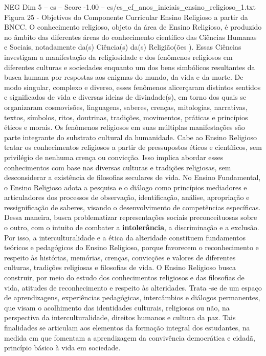 \begin{textsample}{NEG Dim 5 – es – Score -1.00 – es/es\_ef\_anos\_iniciais\_ensino\_religioso\_1.txt}
Figura 25 - Objetivos do Componente Curricular Ensino Religioso a partir da BNCC.
O conhecimento religioso, objeto da área de Ensino Religioso, é produzido no âmbito das diferentes áreas do conhecimento científico das Ciências Humanas e Sociais, notadamente da(s) Ciência(s) da(s) Religião(ões ).
Essas Ciências investigam a manifestação da religiosidade e dos fenômenos religiosos em diferentes culturas e sociedades enquanto um dos bens simbólicos resultantes da busca humana por respostas aos enigmas do mundo, da vida e da morte.
De modo singular, complexo e diverso, esses fenômenos alicerçaram distintos sentidos e significados de vida e diversas ideias de divindade(s), em torno dos quais se organizaram cosmovisões, linguagens, saberes, crenças, mitologias, narrativas, textos, símbolos, ritos, doutrinas, tradições, movimentos, práticas e princípios éticos e morais.
Os fenômenos religiosos em suas múltiplas manifestações são parte integrante do substrato cultural da humanidade.
Cabe ao Ensino Religioso tratar os conhecimentos religiosos a partir de pressupostos éticos e científicos, sem privilégio de nenhuma crença ou convicção.
Isso implica abordar esses conhecimentos com base nas diversas culturas e tradições religiosas, sem desconsiderar a existência de filosofias seculares de vida.
No Ensino Fundamental, o Ensino Religioso adota a pesquisa e o diálogo como princípios mediadores e articuladores dos processos de observação, identificação, análise, apropriação e ressignificação de saberes, visando o desenvolvimento de competências específicas.
Dessa maneira, busca problematizar representações sociais preconceituosas sobre o outro, com o intuito de combater a \textbf{intolerância}, a discriminação e a exclusão.
Por isso, a interculturalidade e a ética da alteridade constituem fundamentos teóricos e pedagógicos do Ensino Religioso, porque favorecem o reconhecimento e respeito às histórias, memórias, crenças, convicções e valores de diferentes culturas, tradições religiosas e filosofias de vida.
O Ensino Religioso busca construir, por meio do estudo dos conhecimentos religiosos e das filosofias de vida, atitudes de reconhecimento e respeito às alteridades.
Trata -se de um espaço de aprendizagens, experiências pedagógicas, intercâmbios e diálogos permanentes, que visam o acolhimento das identidades culturais, religiosas ou não, na perspectiva da interculturalidade, direitos humanos e cultura da paz.
Tais finalidades se articulam aos elementos da formação integral dos estudantes, na medida em que fomentam a aprendizagem da convivência democrática e cidadã, princípio básico à vida em sociedade.

\end{textsample}
